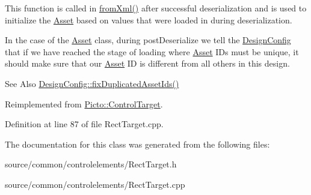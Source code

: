 This function is called in \hyperlink{class_picto_1_1_asset_a8bed4da09ecb1c07ce0dab313a9aba67}{from\-Xml()} after successful deserialization and is used to initialize the \hyperlink{class_picto_1_1_asset}{Asset} based on values that were loaded in during deserialization. 

In the case of the \hyperlink{class_picto_1_1_asset}{Asset} class, during post\-Deserialize we tell the \hyperlink{class_picto_1_1_design_config}{Design\-Config} that if we have reached the stage of loading where \hyperlink{class_picto_1_1_asset}{Asset} I\-Ds must be unique, it should make sure that our \hyperlink{class_picto_1_1_asset}{Asset} I\-D is different from all others in this design. \begin{DoxySeeAlso}{See Also}
\hyperlink{class_picto_1_1_design_config_ab57e0738b97e4358ab09530cd6815fc0}{Design\-Config\-::fix\-Duplicated\-Asset\-Ids()} 
\end{DoxySeeAlso}


Reimplemented from \hyperlink{class_picto_1_1_control_target_a0cd5e40f668903b31db033efdf31829b}{Picto\-::\-Control\-Target}.



Definition at line 87 of file Rect\-Target.\-cpp.



The documentation for this class was generated from the following files\-:\begin{DoxyCompactItemize}
\item 
source/common/controlelements/Rect\-Target.\-h\item 
source/common/controlelements/Rect\-Target.\-cpp\end{DoxyCompactItemize}
